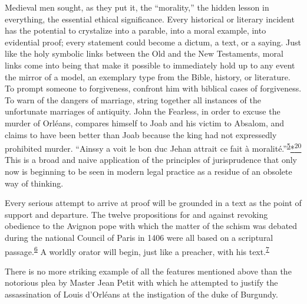 Medieval men sought, as they put it, the ``morality,'' the hidden lesson
in everything, the essential ethical significance. Every historical or
literary incident has the potential to crystalize into a parable, into a
moral example, into evidential proof; every statement could become a
dictum, a text, or a saying. Just like the holy symbolic links between
the Old and the New Testaments, moral links come into being that make it
possible to immediately hold up to any event the mirror of a model, an
exemplary type from the Bible, history, or literature. To prompt someone
to forgiveness, confront him with biblical cases of forgiveness. To warn
of the dangers of marriage, string together all instances of the
unfortunate marriages of antiquity. John the Fearless, in order to
excuse the murder of Orléans, compares himself to Joab and his victim to
Absalom, and claims to have been better than Joab because the king had
not expressedly prohibited murder. ``Ainssy a voit le bon duc Jehan
attrait ce fait à
moralité.''\textsuperscript{\protect\hypertarget{18_Chapter_Eleven__THE_FORMS_OF_THO.xhtmlux5cux23id_621}{\protect\hyperlink{23_NOTES.xhtmlux5cux23id_622}{5}}}\protect\hypertarget{18_Chapter_Eleven__THE_FORMS_OF_THO.xhtmlux5cux23id_2608}{\protect\hyperlink{23_NOTES.xhtmlux5cux23id_2607}{*\textsuperscript{20}}}
This is a broad and naive application of the principles of jurisprudence
that only now is beginning to be seen in modern legal practice as a
residue of an obsolete way of thinking.

Every serious attempt to arrive at proof will be grounded in a text as
the point of support and departure. The twelve propositions for and
against revoking obedience to the Avignon pope with which the matter of
the schism was debated during the national Council of Paris in 1406 were
all based on a scriptural
passage.\textsuperscript{\protect\hypertarget{18_Chapter_Eleven__THE_FORMS_OF_THO.xhtmlux5cux23id_619}{\protect\hyperlink{23_NOTES.xhtmlux5cux23id_620}{6}}}
A worldly orator will begin, just like a preacher, with his
text.\textsuperscript{\protect\hypertarget{18_Chapter_Eleven__THE_FORMS_OF_THO.xhtmlux5cux23id_617}{\protect\hyperlink{23_NOTES.xhtmlux5cux23id_618}{7}}}

There is no more striking example of all the features mentioned above
than the notorious plea by Master Jean Petit with which he attempted to
justify the assassination of Louis d'Orléans at the instigation of the
duke of Burgundy.

